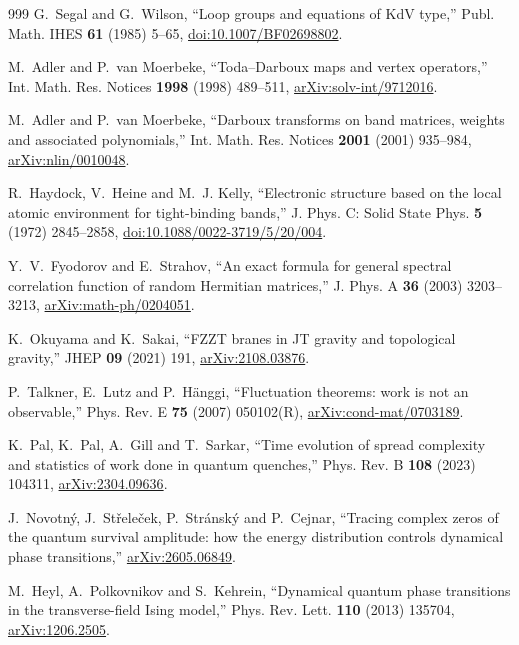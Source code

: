 \documentclass[a4paper,11pt]{article}
\theoremstyle{definition}
\theoremstyle{remark}
\begin{document}
\begin{thebibliography}{999}
G.~Segal and G.~Wilson, ``Loop groups and equations of KdV type,'' Publ. Math. IHES \textbf{61} (1985) 5--65,
\href{https://doi.org/10.1007/BF02698802}{doi:10.1007/BF02698802}.

M.~Adler and P.~van Moerbeke,
``Toda--Darboux maps and vertex operators,''
Int. Math. Res. Notices \textbf{1998} (1998) 489--511, \href{https://arxiv.org/abs/solv-int/9712016}{arXiv:solv-int/9712016}.

M.~Adler and P.~van Moerbeke,
``Darboux transforms on band matrices, weights and associated polynomials,''
Int. Math. Res. Notices \textbf{2001} (2001) 935--984, \href{https://arxiv.org/abs/nlin/0010048}{arXiv:nlin/0010048}.

R.~Haydock, V.~Heine and M.~J. Kelly,
``Electronic structure based on the local atomic environment for tight-binding bands,''
J. Phys. C: Solid State Phys. \textbf{5} (1972) 2845--2858,
\href{https://doi.org/10.1088/0022-3719/5/20/004}{doi:10.1088/0022-3719/5/20/004}.

Y.~V.~Fyodorov and E.~Strahov,
``An exact formula for general spectral correlation function of random Hermitian matrices,''
J. Phys. A \textbf{36} (2003) 3203--3213,
\href{https://arxiv.org/abs/math-ph/0204051}{arXiv:math-ph/0204051}.

K.~Okuyama and K.~Sakai,
``FZZT branes in JT gravity and topological gravity,''
JHEP \textbf{09} (2021) 191,
\href{https://arxiv.org/abs/2108.03876}{arXiv:2108.03876}.

P.~Talkner, E.~Lutz and P.~H\"anggi,
``Fluctuation theorems: work is not an observable,''
Phys. Rev. E \textbf{75} (2007) 050102(R),
\href{https://arxiv.org/abs/cond-mat/0703189}{arXiv:cond-mat/0703189}.

K.~Pal, K.~Pal, A.~Gill and T.~Sarkar,
``Time evolution of spread complexity and statistics of work done in quantum quenches,''
Phys. Rev. B \textbf{108} (2023) 104311,
\href{https://arxiv.org/abs/2304.09636}{arXiv:2304.09636}.

J.~Novotn\'y, J.~St\v{r}ele\v{c}ek, P.~Str\'ansk\'y and P.~Cejnar,
``Tracing complex zeros of the quantum survival amplitude: how the energy distribution controls dynamical phase transitions,''
\href{https://arxiv.org/abs/2605.06849}{arXiv:2605.06849}.

M.~Heyl, A.~Polkovnikov and S.~Kehrein,
``Dynamical quantum phase transitions in the transverse-field Ising model,''
Phys. Rev. Lett. \textbf{110} (2013) 135704,
\href{https://arxiv.org/abs/1206.2505}{arXiv:1206.2505}.


\end{thebibliography}
\end{document}
